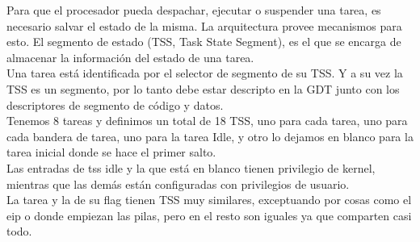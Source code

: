 Para que el procesador pueda despachar, ejecutar o suspender una tarea, es necesario salvar el estado de la misma. La arquitectura provee mecanismos para esto. El segmento de estado (TSS, Task State Segment), es el que se encarga de almacenar la informaci\'on del estado de una tarea.\\
Una tarea est\'a identificada por el selector de segmento de su TSS. Y a su vez la TSS es un segmento, por lo tanto debe estar descripto en la GDT junto con los descriptores de segmento de c\'odigo y datos.\\
Tenemos 8 tareas y definimos un total de 18 TSS, uno para cada tarea, uno para cada bandera de tarea, uno para la tarea Idle, y otro lo dejamos en blanco para la tarea inicial donde se hace el primer salto.\\
Las entradas de tss idle y la que est\'a en blanco tienen privilegio de kernel, mientras que las dem\'as est\'an configuradas con privilegios de usuario.\\
La tarea y la de su flag tienen TSS muy similares, exceptuando por cosas como el eip o donde empiezan las pilas, pero en el resto son iguales ya que comparten casi todo.\\

